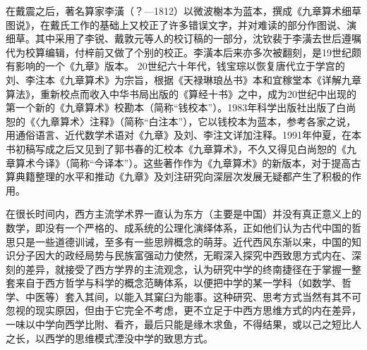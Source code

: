 \documentclass[12pt,UTF8]{ctexbook}
\begin{document}
在戴震之后，著名算家李潢（？—1812）以微波榭本为蓝本，撰成《九章算术细草图说》，在戴氏工作的基础上又校正了许多错误文字，并对难读的部分作图说、演细草。其中采用了李锐、戴敦元等人的校订稿的一部分，沈钦裴于李潢去世后遵嘱代为校算编辑，付梓前又做了个别的校正。李潢本后来亦多次被翻刻，是19世纪颇有影响的一个《九章》版本。
20世纪六十年代，钱宝琮以恢复唐代立于学宫的刘、李注本《九章算术》为宗旨，根据《天禄琳琅丛书》本和宜稼堂本《详解九章算法》，重新校点而收入中华书局出版的《算经十书》之中，成为20世纪中出现的第一个新的《九章算术》校勘本（简称“钱校本”）。1983年科学出版社出版了白尚恕的《〈九章算术〉注释》（简称“白注本”），它以钱校本为蓝本，参考各家之说，用通俗语言、近代数学术语对《九章》及刘、李注文详加注释。1991年仲夏，在本书初稿写成之后又见到了郭书春的汇校本《九章算术》，不久又得见白尚恕的《九章算术今译》（简称“今译本”）。这些著作作为《九章算术》的新版本，对于提高古算典籍整理的水平和推动《九章》及刘注研究向深层次发展无疑都产生了积极的作用。




在很长时间内，西方主流学术界一直认为东方（主要是中国）并没有真正意义上的数学，即没有一个严格的、成系统的公理化演绎体系，正如他们认为古代中国的哲思只是一些道德训诫，至多有一些思辨概念的萌芽。近代西风东渐以来，中国的知识分子因大的政经局势与民族富强动力使然，无暇深入探究中西致思方式内在、深刻的差异，就接受了西方学界的主流观念，认为研究中学的终南捷径在于掌握一整套来自于西方哲学与科学的概念范畴体系，以便把中学的某一学科（如数学、哲学、中医等）套入其间，以能入其窠臼为能事。这种研究、思考方式当然有其不可忽视的现实原因，但由于它完全不考虑，更不立足于中西方思维方式的内在差异，一味以中学向西学比附、看齐，最后只能是缘木求鱼，不得结果，或以己之短比人之长，以西学的思维模式湮没中学的致思方式。
\end{document}
